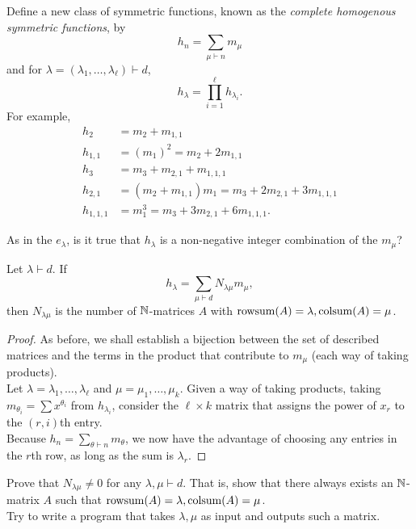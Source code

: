 	Define a new class of symmetric functions, known as the \emph{complete homogenous symmetric functions}, by
	\[ h_n = \sum_{\mu \vdash n} m_\mu \]
	and for $\lambda = (\lambda_1,\ldots,\lambda_\ell) \vdash d$,
	\[ h_\lambda = \prod_{i=1}^{\ell} h_{\lambda_i}. \]
	For example,
	\begin{align*}
		h_2 &= m_2 + m_{1,1} \\
		h_{1,1} &= (m_1)^2 = m_2 + 2m_{1,1} \\
		h_3 &= m_3 + m_{2,1} + m_{1,1,1} \\
		h_{2,1} &= (m_2 + m_{1,1}) m_1 = m_3 + 2m_{2,1} + 3m_{1,1,1} \\
		h_{1,1,1} &= m_1^3 = m_3 + 3m_{2,1} + 6m_{1,1,1}.
	\end{align*}

	As in the $e_\lambda$, is it true that $h_\lambda$ is a non-negative integer combination of the $m_\mu$?
	\begin{flem}
		Let $\lambda \vdash d$. If
		\[ h_\lambda = \sum_{\mu \vdash d} N_{\lambda\mu} m_\mu, \]
		then $N_{\lambda\mu}$ is the number of $\mathbb{N}$-matrices $A$ with $\operatorname{rowsum}(A) = \lambda, \operatorname{colsum}(A) = \mu$.
	\end{flem}
	\begin{proof}
		As before, we shall establish a bijection between the set of described matrices and the terms in the product that contribute to $m_\mu$ (each way of taking products).\\
		Let $\lambda = \lambda_1,\ldots,\lambda_\ell$ and $\mu = \mu_1,\ldots,\mu_k$. Given a way of taking products, taking $m_{\theta_i} = \sum x^{\theta_i}$ from $h_{\lambda_i}$, consider the $\ell \times k$ matrix that assigns the power of $x_r$ to the $(r,i)$th entry.\\ 
		Because $h_n = \sum_{\theta \vdash n} m_\theta$, we now have the advantage of choosing any entries in the $r$th row, as long as the sum is $\lambda_r$.
	\end{proof}


	\begin{exercise}
		Prove that $N_{\lambda\mu} \ne 0$ for any $\lambda,\mu \vdash d$. That is, show that there always exists an $\mathbb{N}$-matrix $A$ such that $\operatorname{rowsum}(A) = \lambda,\operatorname{colsum}(A) = \mu$.\\
		Try to write a program that takes $\lambda,\mu$ as input and outputs such a matrix.
	\end{exercise}

